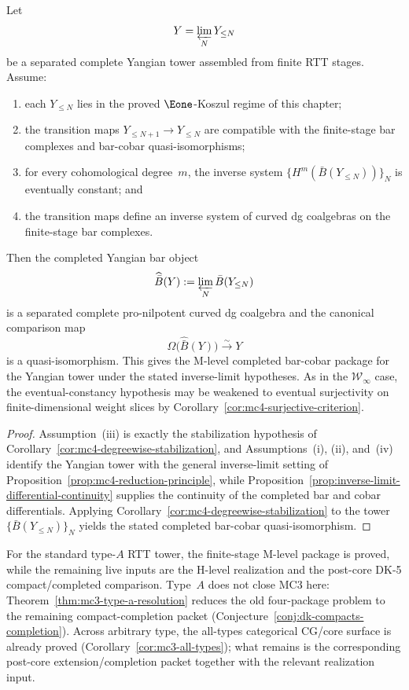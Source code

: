 \begin{proposition}
\label{prop:yangian-tower-mc4-criterion}
Let
\[
Y = \varprojlim_N Y_{\le N}
\]
be a separated complete Yangian tower assembled from finite RTT stages.
Assume:
\begin{enumerate}
\item each $Y_{\le N}$ lies in the proved $\Eone$-Koszul regime of this
 chapter;
\item the transition maps $Y_{\le N+1} \to Y_{\le N}$ are compatible
 with the finite-stage bar complexes and bar-cobar
 quasi-isomorphisms;
\item for every cohomological degree~$m$, the inverse system
 $\{H^m(\bar B(Y_{\le N}))\}_N$ is eventually constant; and
\item the transition maps define an inverse system of curved dg
 coalgebras on the finite-stage bar complexes.
\end{enumerate}
Then the completed Yangian bar object
\[
\widehat{\bar B}(Y) := \varprojlim_N \bar B(Y_{\le N})
\]
is a separated complete pro-nilpotent curved dg coalgebra and the
canonical comparison map
\[
\Omega\bigl(\widehat{\bar B}(Y)\bigr) \xrightarrow{\sim} Y
\]
is a quasi-isomorphism. This gives the M-level completed bar-cobar
package for the Yangian tower under the stated inverse-limit
hypotheses. As in the $\mathcal{W}_\infty$ case, the eventual-constancy
hypothesis may be weakened to eventual surjectivity on finite-dimensional
weight slices by Corollary~\ref{cor:mc4-surjective-criterion}.
\end{proposition}

\begin{proof}
Assumption~\textup{(iii)} is exactly the stabilization hypothesis of
Corollary~\ref{cor:mc4-degreewise-stabilization}, and
Assumptions~\textup{(i)}, \textup{(ii)}, and~\textup{(iv)} identify the
Yangian tower with the general inverse-limit setting of
Proposition~\ref{prop:mc4-reduction-principle}, while
Proposition~\ref{prop:inverse-limit-differential-continuity} supplies
the continuity of the completed bar and cobar differentials.
Applying Corollary~\ref{cor:mc4-degreewise-stabilization} to the tower
$\{\bar B(Y_{\le N})\}_N$ yields the stated completed bar-cobar
quasi-isomorphism.
\end{proof}

\begin{remark}
For the standard type-$A$ RTT tower, the finite-stage M-level package
is proved, while the remaining live inputs are the H-level
realization and the post-core DK-5 compact/completed comparison.
Type~$A$ does not close MC3 here:
Theorem~\ref{thm:mc3-type-a-resolution} reduces the old four-package
problem to the remaining compact-completion packet
\textup{(}Conjecture~\ref{conj:dk-compacts-completion}\textup{)}.
Across arbitrary type, the all-types categorical CG/core surface is
already proved \textup{(}Corollary~\ref{cor:mc3-all-types}\textup{)};
what remains is the corresponding post-core extension/completion
packet together with the relevant realization input.
\end{remark}

